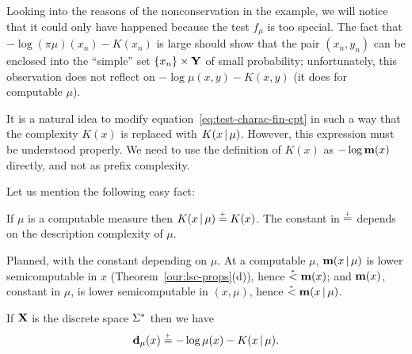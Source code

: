 Looking into the reasons of the nonconservation in the example,
we will notice that it could only have happened because the 
test \( f_{\mu} \) is too special.
The fact that \( -\log (\pi\mu)(x_{n}) - K(x_{n}) \) is large should show that 
the pair \( (x_{n},y_{n}) \) can be enclosed into the ``simple'' set
\( \{x_{n}\} \times \mathbf{Y} \) of small probability; unfortunately, 
this observation does not reflect on 
\( -\log\mu(x,y) - K(x,y) \) (it does for computable \( \mu \)).
 
It is a natural idea to modify equation~\eqref{eq:test-charac-fin-cpt}
in such a way that the complexity \( K(x) \) is replaced with \( K(x \,\vert\, \mu) \).
However, this expression must be understood properly.
We need to use the definition of \( K(x) \) as \( -\log\mathbf{m}(x) \) directly, and not 
as prefix complexity.

Let us mention the following easy fact:

 \begin{proposition}\label{propo:H/mu-computable}
If \( \mu \) is a computable measure then \( K(x \,\vert\, \mu) \stackrel{{}_+}{=} K(x) \).
The constant in \( \stackrel{{}_+}{=} \) depends on the description complexity of \( \mu \).
 \end{proposition}

\begin{formalization}
Planned, with the constant depending on $\mu$. At a computable $\mu$, $\mathbf{m}(x \,\vert\, \mu)$ is lower
semicomputable in $x$ (Theorem~\ref{our:lsc-props}(d)), hence $\stackrel{{}_*}{<}\mathbf{m}(x)$; and $\mathbf{m}(x)$, constant
in $\mu$, is lower semicomputable in $(x,\mu)$, hence $\stackrel{{}_*}{<}\mathbf{m}(x \,\vert\, \mu)$.
\end{formalization}

 \begin{theorem}\label{thm:test-charac-discr}
If \( \mathbf{X} \) is the discrete space \( \Sigma^{*} \) then we have
 \begin{equation}\label{eq:test-charac-discr}
   \mathbf{d}_{\mu}(x) \stackrel{{}_+}{=} -\log\mu(x) - K(x \,\vert\, \mu).
 \end{equation}
 \end{theorem}

